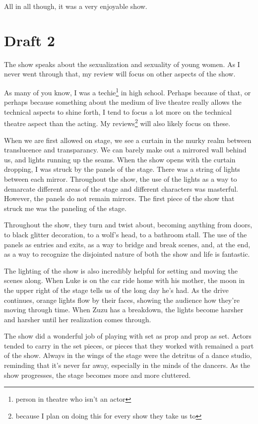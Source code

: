 \documentclass[12pt]{article}[titlepage]
\newcommand{\1}{\={a}}
\newcommand{\2}{\={e}}
\newcommand{\3}{\={\i}}
\newcommand{\4}{\=o}
\newcommand{\5}{\=u}
\newcommand{\6}{\={A}}
\renewcommand{\,}{\textsuperscript{,}}
\begin{document}
All in all though, it was a very enjoyable show.
\section{Draft 2}
The show speaks about the sexualization and sexuality of young women.
As I never went through that, my review will focus on other aspects of the show.

As many of you know, I was a techie\footnote{person in theatre who isn't an actor} in high school.
Perhaps because of that, or perhaps because something about the medium of live theatre really allows the technical aspects to shine forth, I tend to focus a lot more on the technical theatre aspect than the acting.
My reviews\footnote{because I plan on doing this for every show they take us to} will also likely focus on these.

When we are first allowed on stage, we see a curtain in the murky realm between translucence and transparancy.
We can barely make out a mirrored wall behind us, and lights running up the seams.
When the show opens with the curtain dropping, I was struck by the panels of the stage.
There was a string of lights between each mirror.
Throughout the show, the use of the lights as a way to demarcate different areas of the stage and different characters was masterful.
However, the panels do not remain mirrors.
The first piece of the show that struck me was the paneling of the stage.

Throughout the show, they turn and twist about, becoming anything from doors, to black glitter decoration, to a wolf's head, to a bathroom stall.
The use of the panels as entries and exits, as a way to bridge and break scenes, and, at the end, as a way to recognize the disjointed nature of both the show and life is fantastic.

The lighting of the show is also incredibly helpful for setting and moving the scenes along.
When Luke is on the car ride home with his mother, the moon in the upper right of the stage tells us of the long day he's had.
As the drive continues, orange lights flow by their faces, showing the audience how they're moving through time.
When Zuzu has a breakdown, the lights become harsher and harsher until her realization comes through.

The show did a wonderful job of playing with set as prop and prop as set.
Actors tended to carry in the set pieces, or pieces that they worked with remained a part of the show.
Always in the wings of the stage were the detritus of a dance studio, reminding that it's never far away, especially in the minds of the dancers.
As the show progresses, the stage becomes more and more cluttered.
\end{document}
